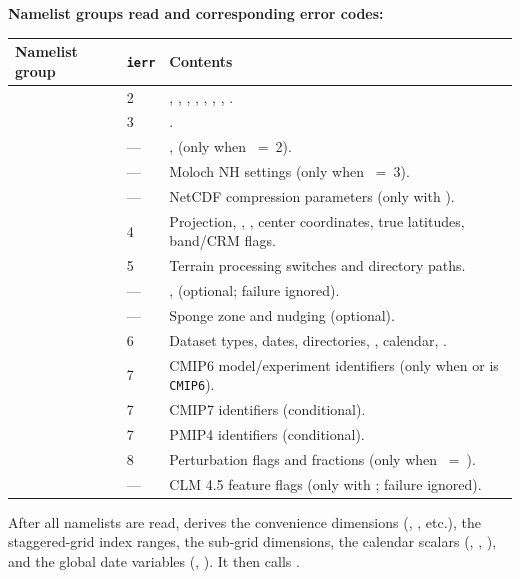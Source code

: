 \textbf{Namelist groups read and corresponding error codes:}

\begin{longtable}{L{3cm} L{2cm} L{9cm}}
  \toprule
  \textbf{Namelist group} & \textbf{\texttt{ierr}} & \textbf{Contents} \\
  \midrule
  \endhead
  \bottomrule
  \endfoot
        & 2 & , , , ,
    , , , . \\
       & 3 & . \\
    & --- & , 
    (only when ~=~2). \\
     & --- & Moloch NH settings
    (only when ~=~3). \\
       & --- & NetCDF compression parameters
    (only with ). \\
        & 4 & Projection, , , center
    coordinates, true latitudes, band/CRM flags. \\
    & 5 & Terrain processing switches and directory paths. \\
      & --- & , 
    (optional; failure ignored). \\
   & --- & Sponge zone and nudging (optional). \\
    & 6 & Dataset types, dates, directories,
    , calendar, . \\
      & 7 & CMIP6 model/experiment identifiers
    (only when  or  is \texttt{CMIP6}). \\
      & 7 & CMIP7 identifiers (conditional). \\
      & 7 & PMIP4 identifiers (conditional). \\
    & 8 & Perturbation flags and fractions
    (only when ~=~). \\
      & --- & CLM 4.5 feature flags
    (only with ; failure ignored). \\
\end{longtable}

After all namelists are read,  derives the convenience
dimensions (, , etc.), the staggered-grid index
ranges, the sub-grid dimensions, the calendar scalars (,
, ), and the global date variables
(, ). It then calls
.

